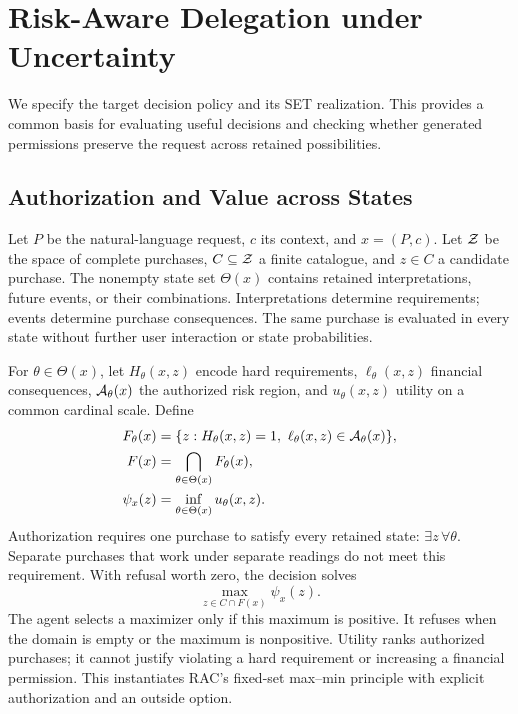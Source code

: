 \section{Risk-Aware Delegation under Uncertainty}
\label{sec:method}
\label{sec:contract}
We specify the target decision policy and its SET realization. This provides a common basis for evaluating useful decisions and checking whether generated permissions preserve the request across retained possibilities.

\subsection{Authorization and Value across States}
\label{sec:formulation}
Let $P$ be the natural-language request, $c$ its context, and $x=(P,c)$. Let $\mathcal Z$ be the space of complete purchases, $C\subseteq\mathcal Z$ a finite catalogue, and $z\in C$ a candidate purchase. The nonempty state set $\Theta(x)$ contains retained interpretations, future events, or their combinations. Interpretations determine requirements; events determine purchase consequences. The same purchase is evaluated in every state without further user interaction or state probabilities.

For $\theta\in\Theta(x)$, let $H_\theta(x,z)$ encode hard requirements, $\ell_\theta(x,z)$ financial consequences, $\mathcal A_\theta(x)$ the authorized risk region, and $u_\theta(x,z)$ utility on a common cardinal scale. Define
\begin{align}
F_\theta(x)&=\{z:H_\theta(x,z)=1,\ \ell_\theta(x,z)\in\A_\theta(x)\},\label{eq:state}\\
F(x)&=\bigcap_{\theta\in\Theta(x)}F_\theta(x),\label{eq:common}\\
\psi_x(z)&=\inf_{\theta\in\Theta(x)}u_\theta(x,z).\label{eq:robust}
\end{align}
Authorization requires one purchase to satisfy every retained state: $\exists z\,\forall\theta$. Separate purchases that work under separate readings do not meet this requirement. With refusal worth zero, the decision solves
\begin{equation}
\max_{z\in C\cap F(x)}\psi_x(z).
\label{eq:decision}
\end{equation}
The agent selects a maximizer only if this maximum is positive. It refuses when the domain is empty or the maximum is nonpositive. Utility ranks authorized purchases; it cannot justify violating a hard requirement or increasing a financial permission. This instantiates RAC's fixed-set max--min principle \citep{rac} with explicit authorization and an outside option.

